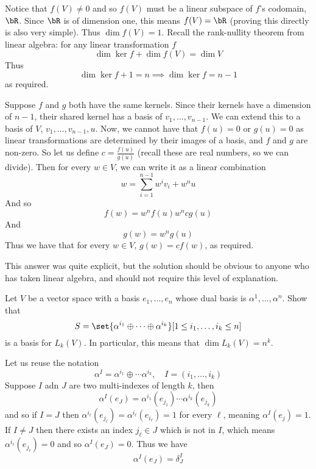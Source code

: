 \documentclass[10pt]{article}
\begin{document}
\benum
    \item Notice that $f(V)\neq0$ and so $f(V)$ must be a linear subspace of $f$'s codomain, $\bR$.
        Since $\bR$ is of dimension one, this means $f(V)=\bR$ (proving this directly is also very simple).
        Thus $\dim f(V)=1$.
        Recall the rank-nullity theorem from linear algebra: for any linear transformation $f$
        \[ \dim\ker f + \dim f(V) = \dim V \]
        Thus
        \[ \dim\ker f + 1 = n \implies \dim\ker f = n - 1 \]
        as required.
    \item Suppose $f$ and $g$ both have the same kernels.
        Since their kernels have a dimension of $n-1$, their shared kernel has a basis of $v_1,\dots,v_{n-1}$.
        We can extend this to a basis of $V$, $v_1,\dots,v_{n-1},u$.
        Now, we cannot have that $f(u)=0$ or $g(u)=0$ as linear transformations are determined by their images of a basis, and $f$ and $g$ are non-zero.
        So let us define $c=\frac{f(u)}{g(u)}$ (recall these are real numbers, so we can divide).
        Then for every $w\in V$, we can write it as a linear combination
        \[ w = \sum_{i=1}^{n-1} w^iv_i + w^nu \]
        And so
        \[ f(w) = w^nf(u) w^ncg(u) \]
        And
        \[ g(w) = w^ng(u) \]
        Thus we have that for every $w\in V$, $g(w)=cf(w)$, as required.
\eenum

This answer was quite explicit, but the solution should be obvious to anyone who has taken linear algebra, and should not require this level of explanation.

\begin{exercise*}

    Let $V$ be a vector space with a basis $e_1,\dots,e_n$ whose dual basis is $\alpha^1,\dots,\alpha^n$.
    Show that
    \[ S = \set{\alpha^{i_1}\oplus\cdots\oplus\alpha^{i_k}}[1\leq i_1,\dots,i_k\leq n] \]
    is a basis for $L_k(V)$.
    In particular, this means that $\dim L_k(V)=n^k$.

\end{exercise*}

Let us reuse the notation
\[ \alpha^I = \alpha^{i_1}\oplus\cdots\alpha^{i_k},\quad I = (i_1,\dots,i_k) \]
Suppose $I$ adn $J$ are two multi-indexes of length $k$, then
\[ \alpha^I(e_J) = \alpha^{i_1}(e_{j_1})\cdots\alpha^{i_k}(e_{j_k}) \]
and so if $I=J$ then $\alpha^{i_\ell}(e_{j_\ell})=\alpha^{i_\ell}(e_{i_\ell})=1$ for every $\ell$, meaning $\alpha^I(e_j)=1$.
If $I\neq J$ then there exists an index $j_\ell\in J$ which is not in $I$, which means $\alpha^{i_\ell}(e_{j_\ell})=0$ and so $\alpha^I(e_J)=0$.
Thus we have
\[ \alpha^I(e_J) = \delta^I_J \]
\end{document}
